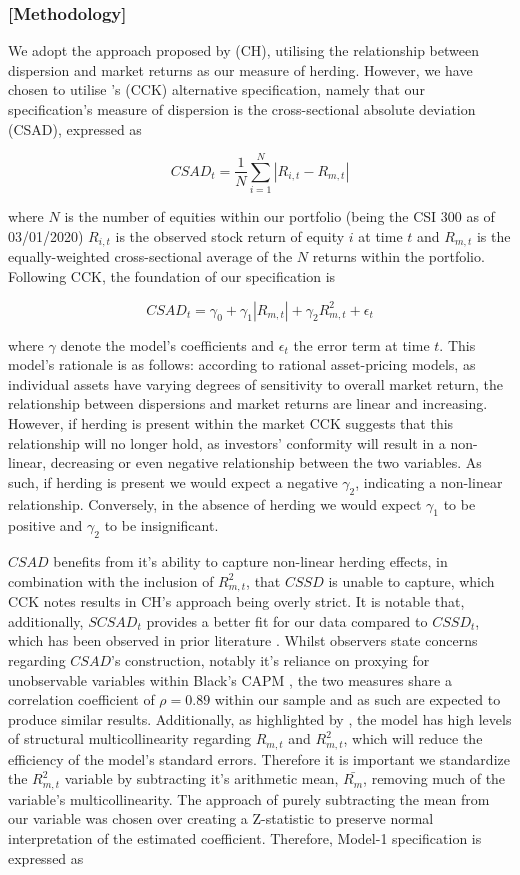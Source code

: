 \documentclass[12pt]{article}
\numberwithin{table}{section}   %
\begin{document}
\subsubsection*{[Methodology]}

We adopt the approach proposed by \citet{ch} (CH), utilising the relationship between dispersion and market returns as our measure of herding. However, we have chosen to utilise \citet{cck}'s (CCK) alternative specification, namely that our specification’s measure of dispersion is the cross-sectional absolute deviation (CSAD), expressed as

$$
CSAD_t=\frac{1}{N}\sum^N_{i=1}|R_{i,t}-R_{m,t}|
$$

where $N$ is the number of equities within our portfolio (being the CSI 300 as of 03/01/2020) $R_{i,t}$ is the observed stock return of equity $i$ at time $t$ and $R_{m,t}$ is the equally-weighted cross-sectional average of the $N$ returns within the portfolio. Following CCK, the foundation of our specification is

$$
CSAD_t=\gamma_0+\gamma_1 |R_{m,t}|+\gamma_2 R_{m,t}^2+\epsilon_t
$$

where $\gamma$ denote the model’s coefficients and $\epsilon_t$ the error term at time $t$. This model’s rationale is as follows: according to rational asset-pricing models, as individual assets have varying degrees of sensitivity to overall market return, the relationship between dispersions and market returns are linear and increasing. However, if herding is present within the market CCK suggests that this relationship will no longer hold, as investors’ conformity will result in a non-linear, decreasing or even negative relationship between the two variables. As such, if herding is present we would expect a negative $\gamma_2$, indicating a non-linear relationship. Conversely, in the absence of herding we would expect $\gamma_1$ to be positive and $\gamma_2$ to be insignificant.

$CSAD$ benefits from it’s ability to capture non-linear herding effects, in combination with the inclusion of $R_{m,t}^2$, that $CSSD$ is unable to capture, which CCK notes results in CH’s approach being overly strict. It is notable that, additionally, $SCSAD_t$ provides a better fit for our data compared to $CSSD_t$, which has been observed in prior literature \citep{gleason}. Whilst observers state concerns regarding $CSAD$’s construction, notably it’s reliance on proxying for unobservable variables within Black’s CAPM \citep{yao, tan}, the two measures share a correlation coefficient of $\rho=0.89$ within our sample and as such are expected to produce similar results. Additionally, as highlighted by \citet{yao}, the model has high levels of structural multicollinearity regarding $R_{m,t}$ and $R_{m,t}^2$, which will reduce the efficiency of the model's standard errors. Therefore it is important we standardize the $R_{m,t}^2$ variable by subtracting it's arithmetic mean, $\bar{R_m}$, removing much of the variable's multicollinearity. The approach of purely subtracting the mean from our variable was chosen over creating a Z-statistic to preserve normal interpretation of the estimated coefficient. Therefore, Model-1 specification is expressed as
\end{document}
